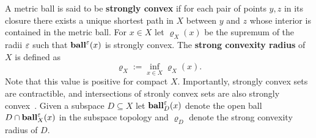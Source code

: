 A metric ball is said to be \textbf{strongly convex} if for each pair of points $y,z$ in its closure there exists a unique shortest path in $X$ between $y$ and $z$ whose interior is contained in the metric ball.
For $x\in X$ let $\varrho_X(x)$ be the supremum of the radii $\varepsilon$ such that $\mathbf{ball}^\varepsilon(x)$ is strongly convex.
The \textbf{strong convexity radius} of $X$ is defined as
\[ \varrho_X := \inf_{x\in X} \varrho_X(x).\]
Note that this value is positive for compact $X$.
Importantly, strongly convex sets are contractible, and intersections of stronly convex sets are also strongly convex~\cite{chazal09analysis}.
Given a subspace $D\subseteq X$ let $\mathbf{ball}_D^\varepsilon(x)$ denote the open ball $D\cap \mathbf{ball}_X^\varepsilon(x)$ in the subspace topology and $\varrho_D$ denote the strong convexity radius of $D$.
